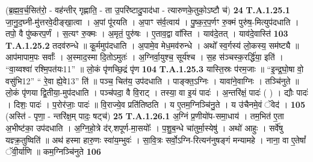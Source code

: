 \documentclass[17pt]{extarticle}
\begin{document}
                  \newline
                                                        (ब्र॒ह्म॒व॒र्च॒सित॑रो॒ - वह॑न्तीर् गृह्णाति॒ - ता उ॒परि॑ष्टादु॒पाद॑धा - त्यारुणके॒तुको॒ऽष्टौ च॑) \textbf{24} \newline \newline
                                \textbf{ T.A.1.25.1} \newline
                  जा॒नु॒द॒घ्नी-मु॑त्तरवे॒दीङ्खा॒त्वा । अ॒पां पू॑रयति । अ॒पाꣳ स॑र्व॒त्वाय॑ । पु॒ष्क॒र॒प॒र्णꣳ रु॒क्मं पुरु॑ष॒-मित्युप॑दधाति । तपो॒ वै पु॑ष्करप॒र्णं ।  स॒त्यꣳ रु॒क्मः । अ॒मृतं॒ पुरु॑षः । ए॒ताव॒द्वा वा᳚स्ति । याव॑दे॒तत् । याव॑दे॒वास्ति॑ \textbf{ 103} \newline
                  \newline
                                                                  \textbf{ T.A.1.25.2} \newline
                  तदव॑रुन्धे ॥ कू॒र्ममुप॑दधाति । अ॒पामे॒व मेध॒मव॑रुन्धे । अथो᳚ स्व॒र्गस्य॑ लो॒कस्य॒ सम॑ष्ट्यै ॥ आप॑मापाम॒पः सर्वाः᳚ ।  अ॒स्माद॒स्मा दि॒तोऽमुतः॑ । अ॒ग्निर्वा॒युश्च॒ सूर्य॑श्च ।  स॒ह स॑ञ्चस्क॒रर्द्धि॑या॒ इति॑ । “वा॒य्वश्वा॑ रश्मि॒पत॑यः{11}” ॥ लो॒कं पृ॑णच्छि॒द्रं पृ॑ण \textbf{ 104} \newline
                  \newline
                                                                  \textbf{ T.A.1.25.3} \newline
                  यास्ति॒स्रः प॑रम॒जाः ॥ “इ॒न्द्र॒घो॒षा वो॒ वसु॑भि{12}” “ रे॒वा ह्ये॒वे{13}” ति॑ ॥ पञ्च॒ चित॑य॒ उप॑दधाति । पाङ्क्त॒ऽग्निः । यावा॑ने॒वाग्निः । तञ्चि॑नुते ॥  लो॒कं पृ॑णया द्वि॒तीया॒-मुप॑दधाति ।  पञ्च॑पदा॒ वै वि॒राट् । तस्या॒ वा इ॒यं पादः॑ । अ॒न्तरि॑क्षं॒ पादः॑ ( ) । द्यौः पादः॑ । दिशः॒ पादः॑ । प॒रोर॑जाः॒ पादः॑ ॥ वि॒राज्ये॒व प्रति॑तिष्ठति ।  य ए॒तम॒ग्निञ्चि॑नु॒ते । य उ॑चैनमे॒वं ॅवेद॑ । \textbf{ 105} \newline
                  \newline
                                                        (अस्ति॑ - पृणा॒ - न्तरि॑क्ष॒म् पादः॒ षट्च॑) \textbf{25} \newline \newline
                                \textbf{ T.A.1.26.1} \newline
                  अ॒ग्निं प्र॒णीयो॑प-समा॒धाय॑ । तम॒भित॑ ए॒ता अ॒भीष्ट॑का॒ उप॑दधाति । अ॒ग्नि॒हो॒त्रे द॑र्.शपूर्ण-मा॒सयोः᳚ । प॒शु॒ब॒न्धे चा॑तुर्मा॒स्येषु॑ ।  अथो॑ आहुः । सर्वे॑षु यज्ञ्क्र॒तुष्विति॑ ॥  अथ॑ हस्मा हारु॒णः स्वा॑य॒म्भुवः॑ ।  सा॒वि॒त्रः सर्वो॒ऽग्नि-रित्यन॑नुषङ्गं मन्यामहे ।  नाना॒ वा ए॒तेषां᳚ ॅवी॒र्या॑णि ॥ कम॒ग्निञ्चि॑नुते \textbf{ 106} \newline
\end{document}
